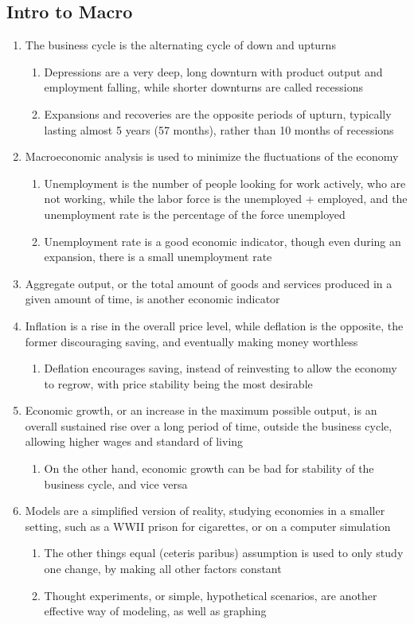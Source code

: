 \documentclass[11 pt, twoside]{article}
\begin{document}
\subsection{Intro to Macro}
\begin{enumerate}
\item The business cycle is the alternating cycle of down and upturns
\begin{enumerate}
\item Depressions are a very deep, long downturn with product output and employment falling, while shorter downturns are
called recessions
\item Expansions and recoveries are the opposite periods of upturn, typically lasting almost 5 years (57 months), rather
than 10 months of recessions
\end{enumerate}
\item Macroeconomic analysis is used to minimize the fluctuations of the economy
\begin{enumerate}
\item Unemployment is the number of people looking for work actively, who are not working, while the labor force is the
unemployed + employed, and the unemployment rate is the percentage of the force unemployed
\item Unemployment rate is a good economic indicator, though even during an expansion, there is a small unemployment
rate
\end{enumerate}
\item Aggregate output, or the total amount of goods and services produced in a given amount of time, is another
economic indicator
\item Inflation is a rise in the overall price level, while deflation is the opposite, the former discouraging saving,
and eventually making money worthless
\begin{enumerate}
\item Deflation encourages saving, instead of reinvesting to allow the economy to regrow, with price stability being the
most desirable
\end{enumerate}
\item Economic growth, or an increase in the maximum possible output, is an overall sustained rise over a long period of
time, outside the business cycle, allowing higher wages and standard of living
\begin{enumerate}
\item On the other hand, economic growth can be bad for stability of the business cycle, and vice versa
\end{enumerate}
\item Models are a simplified version of reality, studying economies in a smaller setting, such as a WWII prison for
cigarettes, or on a computer simulation
\begin{enumerate}
\item The other things equal (ceteris paribus) assumption is used to only study one change, by making all other factors
constant
\item Thought experiments, or simple, hypothetical scenarios, are another effective way of modeling, as well as graphing
\end{enumerate}
\end{enumerate}
\end{document}
